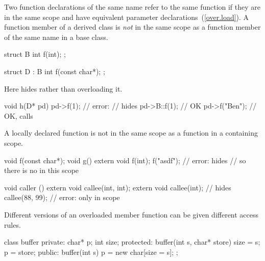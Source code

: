 \pnum
Two function declarations of the same name refer to the same function if they
are in the same scope and have equivalent parameter declarations~(\ref{over.load}).
A function member of a derived class is
\textit{not}
in the same scope as a function member of the same name in a base class.
\begin{example}

\begin{codeblock}
struct B {
  int f(int);
};

struct D : B {
  int f(const char*);
};
\end{codeblock}

%
%
Here
hides
rather than overloading it.

%
\begin{codeblock}
void h(D* pd) {
  pd->f(1);                     // error:
                                //  hides 
  pd->B::f(1);                  // OK
  pd->f("Ben");                 // OK, calls 
}
\end{codeblock}
\end{example}

\pnum
A locally declared function is not in the same scope as a function in
a containing scope.
\begin{example}

\begin{codeblock}
void f(const char*);
void g() {
  extern void f(int);
  f("asdf");                    // error:  hides 
                                // so there is no  in this scope
}

void caller () {
  extern void callee(int, int);
  {
    extern void callee(int);    // hides 
    callee(88, 99);             // error: only  in scope
  }
}
\end{codeblock}
\end{example}

\pnum
{}%
%
Different versions of an overloaded member function can be given different
access rules.
\begin{example}

\begin{codeblock}
class buffer {
private:
    char* p;
    int size;
protected:
    buffer(int s, char* store) { size = s; p = store; }
public:
    buffer(int s) { p = new char[size = s]; }
};
\end{codeblock}
\end{example}

